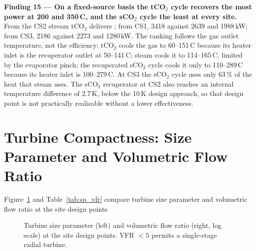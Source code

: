 \begin{findingbox}
\textbf{Finding 15 --- On a fixed-source basis the tCO$_2$ cycle recovers the
most power at 200 and 350\,\textdegree C, and the sCO$_2$ cycle the least at
every site.}
From the CS2 stream tCO$_2$ delivers ; from CS1, 3418 against 2639 and 1988\,kW;
from CS3, 2186 against 2273 and 1280\,kW. The ranking follows the gas outlet
temperature, not the efficiency: tCO$_2$ cools the gas to 60--151\,\textdegree C
because its heater inlet is the recuperator outlet at 50--141\,\textdegree C;
steam cools it to 114--165\,\textdegree C, limited by the evaporator pinch;
the recuperated sCO$_2$ cycle cools it only to 110--289\,\textdegree C because
its heater inlet is 100--279\,\textdegree C. At CS3 the sCO$_2$ cycle uses
only 63\,\% of the heat that steam uses. The sCO$_2$ recuperator at CS2 also
reaches an internal temperature difference of 2.7\,K, below the 10\,K design
approach, so that design point is not practically realisable without a lower
effectiveness.
\end{findingbox}

\section{Turbine Compactness: Size Parameter and Volumetric Flow Ratio}
\label{sec:rq2_sp_vfr}

Figure~\ref{fig:sp_vfr} and Table~\ref{tab:sp_vfr} compare turbine size
parameter and volumetric flow ratio at the site design points.

\begin{figure}[H]
\centering
{}
\caption{Turbine size parameter (left) and volumetric flow ratio (right, log
scale) at the site design points. VFR $< 5$ permits a single-stage radial
turbine.}
\label{fig:sp_vfr}
\end{figure}

